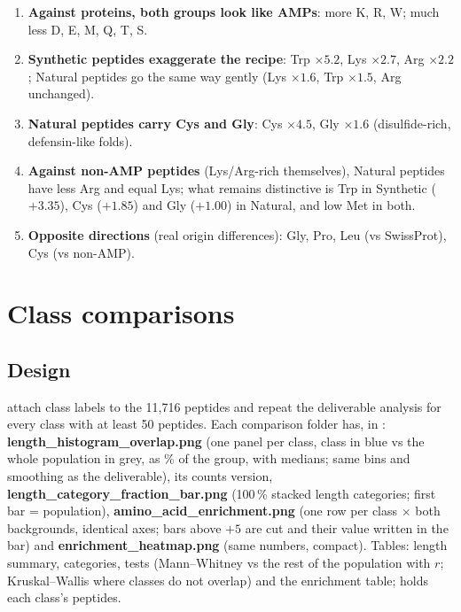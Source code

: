 \documentclass[11pt,a4paper]{article}
\begin{document}
\begin{enumerate}
\item \textbf{Against proteins, both groups look like AMPs}: more K, R, W; much less D, E, M, Q, T, S.
\item \textbf{Synthetic peptides exaggerate the recipe}: Trp $\times5.2$, Lys $\times2.7$, Arg $\times2.2$; Natural peptides go the same way gently (Lys $\times1.6$, Trp $\times1.5$, Arg unchanged).
\item \textbf{Natural peptides carry Cys and Gly}: Cys $\times4.5$, Gly $\times1.6$ (disulfide-rich, defensin-like folds).
\item \textbf{Against non-AMP peptides} (Lys/Arg-rich themselves), Natural peptides have less Arg and equal Lys; what remains distinctive is Trp in Synthetic ($+3.35$), Cys ($+1.85$) and Gly ($+1.00$)
      in Natural, and low Met in both.
\item \textbf{Opposite directions} (real origin differences): Gly, Pro, Leu (vs SwissProt), Cys (vs non-AMP).
\end{enumerate}

\section{Class comparisons}\label{sec:cc}
\subsection{Design}
 attach class labels to the 11{,}716 peptides and repeat the deliverable analysis for every class with at least 50 peptides.
Each comparison folder has, in : \textbf{length\_histogram\_overlap.png} (one panel per class, class in blue vs the whole population in grey, as \% of the group,
with medians; same bins and smoothing as the deliverable), its counts version, \textbf{length\_category\_fraction\_bar.png} (100\,\% stacked length categories; first bar = population),
\textbf{amino\_acid\_enrichment.png} (one row per class $\times$ both backgrounds, identical axes; bars above $+5$ are cut and their value written in the bar) and
\textbf{enrichment\_heatmap.png} (same numbers, compact). Tables: length summary, categories, tests (Mann--Whitney vs the rest of the population with $r$; Kruskal--Wallis where classes do not overlap)
and the enrichment table;  holds each class's peptides.
\end{document}
